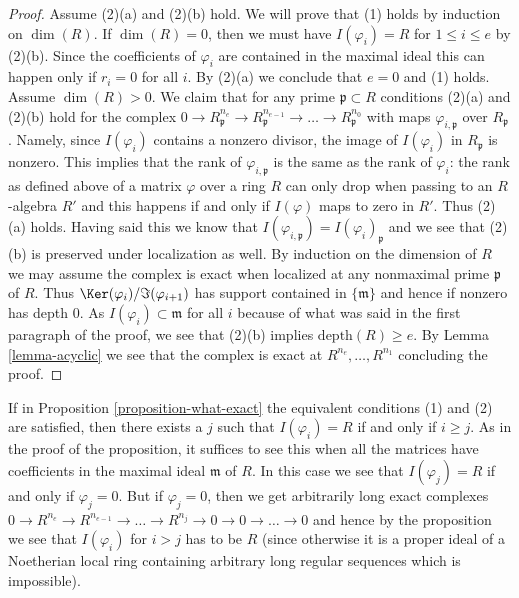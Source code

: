\begin{proof}
\medskip\noindent
Assume (2)(a) and (2)(b) hold. We will prove that (1) holds by
induction on $\dim(R)$. If $\dim(R) = 0$, then we must have
$I(\varphi_i) = R$ for $1 \leq i \leq e$ by (2)(b). Since the
coefficients of $\varphi_i$ are contained in the maximal ideal
this can happen only if $r_i = 0$ for all $i$. By (2)(a) we
conclude that $e = 0$ and (1) holds. Assume $\dim(R) > 0$.
We claim that for any prime $\mathfrak p \subset R$ conditions
(2)(a) and (2)(b) hold for the complex
$0 \to R_\mathfrak p^{n_e} \to R_\mathfrak p^{n_{e - 1}} \to \ldots \to
R_\mathfrak p^{n_0}$ with maps $\varphi_{i, \mathfrak p}$
over $R_\mathfrak p$. Namely, since $I(\varphi_i)$ contains a
nonzero divisor, the image of $I(\varphi_i)$ in $R_\mathfrak p$
is nonzero. This implies that the rank of $\varphi_{i, \mathfrak p}$
is the same as the rank of $\varphi_i$: the rank as defined above
of a matrix $\varphi$ over a ring $R$ can only drop when passing
to an $R$-algebra $R'$ and this happens if and only if $I(\varphi)$
maps to zero in $R'$. Thus (2)(a) holds. Having said this
we know that $I(\varphi_{i, \mathfrak p}) = I(\varphi_i)_\mathfrak p$
and we see that (2)(b) is preserved under localization as well.
By induction on the dimension of $R$ we may assume the complex
is exact when localized at any nonmaximal prime $\mathfrak p$ of $R$.
Thus $\Ker(\varphi_i)/\Im(\varphi_{i + 1})$ has support contained in
$\{\mathfrak m\}$ and hence if nonzero has depth $0$.
As $I(\varphi_i) \subset \mathfrak m$ for all $i$ because
of what was said in the first paragraph of the proof, we
see that (2)(b) implies $\text{depth}(R) \geq e$.
By Lemma \ref{lemma-acyclic} we see
that the complex is exact at $R^{n_e}, \ldots, R^{n_1}$
concluding the proof.
\end{proof}

\begin{remark}
\label{remark-what-exact}
If in Proposition \ref{proposition-what-exact} the equivalent conditions (1)
and (2) are satisfied, then there exists a $j$ such that $I(\varphi_i) = R$
if and only if $i \geq j$. As in the proof of the proposition, it suffices
to see this when all the matrices have coefficients in the maximal ideal
$\mathfrak m$ of $R$. In this case we see that $I(\varphi_j) = R$
if and only if $\varphi_j = 0$. But if $\varphi_j = 0$, then we get
arbitrarily long exact complexes
$0 \to R^{n_e} \to R^{n_{e-1}} \to \ldots
\to R^{n_j} \to 0 \to 0 \to \ldots \to 0$
and hence by the proposition we see that $I(\varphi_i)$ for $i > j$
has to be $R$ (since otherwise it is a proper ideal of a Noetherian
local ring containing arbitrary long regular sequences which is impossible).
\end{remark}











